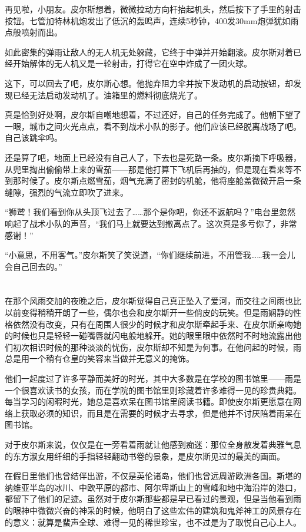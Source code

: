 再见啦，小朋友。皮尔斯想着，微微拉动方向杆抬起机头，然后按下了手里的射击按钮。七管加特林机炮发出了低沉的轰鸣声，连续5秒钟，400发30mm炮弹犹如雨点般喷射而出。

如此密集的弹雨让敌人的无人机无处躲藏，它终于中弹并开始翻滚。皮尔斯对着已经开始解体的无人机又是一轮射击，打得它在空中炸成了一团火球。

这下，可以回去了吧，皮尔斯心想。他抛弃阻力伞并按下发动机的启动按钮，却发现已经无法启动发动机了。油箱里的燃料彻底烧光了。

真是恰到好处啊，皮尔斯自嘲地想着，不过还好，自己的任务完成了。他朝下望了一眼，城市之间火光点点，看不到战术小队的影子。他们应该已经脱离战场了吧。自己该跳伞吗。

还是算了吧，地面上已经没有自己人了，下去也是死路一条。皮尔斯摘下呼吸器，从兜里掏出偷偷带上来的雪茄——那是他打算下飞机后再抽的，但是现在看来等不到那时候了。皮尔斯点燃雪茄，烟气充满了密封的机舱，他将座舱盖微微开启一条缝隙，强烈的气流立即吹了进来。

“狮鹫！我们看到你从头顶飞过去了……那个是你吧，你还不返航吗？”电台里忽然响起了战术小队的声音，“我们马上就要达到撤离点了。这次真是多亏你了，非常感谢！”

“小意思，不用客气。”皮尔斯笑了笑说道，“你们继续前进，不用管我……我一会儿会自己回去的。”

\section*{}

在那个风雨交加的夜晚之后，皮尔斯觉得自己真正坠入了爱河，而交往之间雨也比以前变得稍稍开朗了一些，偶尔也会和皮尔斯开一些俏皮的玩笑。但是雨娴静的性格依然没有改变，只有在周围人很少的时候才和皮尔斯牵起手来、在皮尔斯亲吻她的时候也只是轻轻一碰嘴唇就闪电般地躲开。她的眼里眼中依然时不时地流露出他们初次相识时候的那种淡淡的忧伤，皮尔斯却不知是为何事。在他问起的时候，雨总是用一个稍有仓皇的笑容来当做并无意义的掩饰。

他们一起度过了许多平静而美好的时光，其中大多数是在学校的图书馆里——雨是一个很喜欢读书的女孩，而在学院的图书馆里则珍藏着许多难得一见的珍贵典籍。每当学习的闲暇时光，她总是喜欢呆在图书馆里阅读书籍。即使皮尔斯更愿意在网络上获取必须的知识，而且是在需要的时候才去寻求，但是他并不讨厌陪着雨呆在图书馆。

对于皮尔斯来说，仅仅是在一旁看着雨就让他感到痴迷：那位全身散发着典雅气息的东方淑女用纤细的手指轻轻翻动书卷的景象，是皮尔斯见过的最美的画面。

在假日里他们也曾结伴出游，不仅是英伦诸岛，他们也曾远周游欧洲各国。斯堪的纳维亚半岛的冰川、中欧平原的都市、阿尔卑斯山上的雪峰和地中海沿岸的港口，都留下了他们的足迹。虽然对于皮尔斯那些都是早已看过的景观，但是当他看到雨的眼神中微微兴奋的神采的时候，他明白了这些宏伟的建筑和鬼斧神工的风景存在的意义：就算是蜚声全球、难得一见的稀世珍宝，也不过是为了取悦自己心上人。

